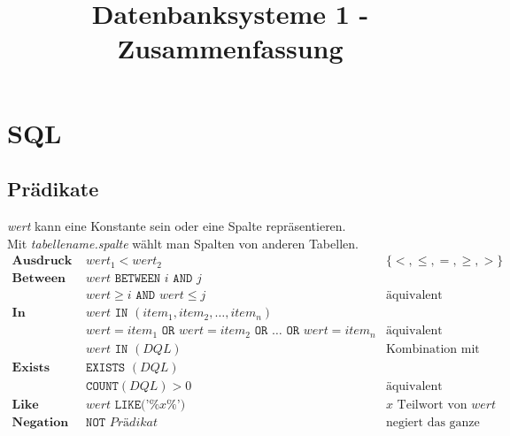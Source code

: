 \documentclass{article}
\title{Datenbanksysteme 1 - Zusammenfassung}
\begin{document}
	\section*{SQL}
		\subsection*{Pr\"adikate}
			\textit{wert} kann eine Konstante sein oder eine Spalte repr\"asentieren.\\
			Mit \textit{tabellename.spalte} w\"ahlt man Spalten von anderen Tabellen.\\
			\begin{align*}
				\textbf{Ausdruck } & \textit{wert$_1$} < \textit{wert$_2$} & \{<, \leq, = ,\geq, >\} \\
				\textbf{Between } & \textit{wert} \texttt{ BETWEEN } i \texttt{ AND } j\\
				& \textit{wert} \geq i \texttt{ AND } \textit{wert} \leq j & \text{\"aquivalent}\\
				\textbf{In } & \textit{wert} \texttt{ IN } (\textit{item}_1,\textit{item}_2,\ldots,\textit{item}_n)\\
				& \textit{wert} = \textit{item$_1$} \texttt{ OR }\textit{wert} = \textit{item$_2$} \texttt{ OR } \ldots \texttt{ OR } \textit{wert} = \textit{item$_n$} & \text{\"aquivalent}\\
				& \textit{wert} \texttt{ IN } (\textit{DQL}) & \text{Kombination mit DQL}\\
				\textbf{Exists } & \texttt{EXISTS } (\textit{DQL})\\
				& \texttt{COUNT}(\textit{DQL}) > 0 & \text{\"aquivalent}\\
				\textbf{Like } & \textit{wert} \texttt{ LIKE('\%}\textit{x}\texttt{\%') } & \textit{x } \text{Teilwort von } \textit{wert}\\
				\textbf{Negation } & \texttt{NOT } \textit{Pr\"adikat} & \text{negiert das ganze}\\
			\end{align*}
\end{document}
